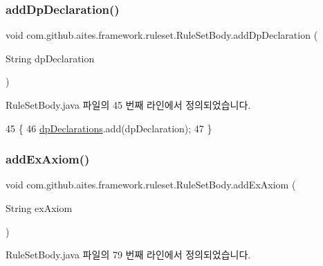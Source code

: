 \subsubsection{\texorpdfstring{add\+Dp\+Declaration()}{addDpDeclaration()}}
{\footnotesize\ttfamily void com.\+github.\+aites.\+framework.\+ruleset.\+Rule\+Set\+Body.\+add\+Dp\+Declaration (\begin{DoxyParamCaption}\item[{String}]{dp\+Declaration }\end{DoxyParamCaption})}



Rule\+Set\+Body.\+java 파일의 45 번째 라인에서 정의되었습니다.


\begin{DoxyCode}
45                                                       \{
46         \mbox{\hyperlink{classcom_1_1github_1_1aites_1_1framework_1_1ruleset_1_1_rule_set_body_a04dba43584689b29c9da9a357effe069}{dpDeclarations}}.add(dpDeclaration);
47     \}
\end{DoxyCode}
\mbox{\label{classcom_1_1github_1_1aites_1_1framework_1_1ruleset_1_1_rule_set_body_a3dc75a4f482086da7e30b637961c54d0}} 
\subsubsection{\texorpdfstring{add\+Ex\+Axiom()}{addExAxiom()}}
{\footnotesize\ttfamily void com.\+github.\+aites.\+framework.\+ruleset.\+Rule\+Set\+Body.\+add\+Ex\+Axiom (\begin{DoxyParamCaption}\item[{String}]{ex\+Axiom }\end{DoxyParamCaption})}



Rule\+Set\+Body.\+java 파일의 79 번째 라인에서 정의되었습니다.


